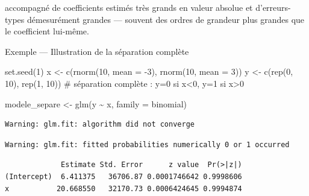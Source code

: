 \documentclass[
  french,
  letterpaper,
  DIV=11,
  numbers=noendperiod]{scrreprt}
\newenvironment{Shaded}{\begin{snugshade}}{\end{snugshade}}
\newcommand{\AttributeTok}[1]{\textcolor[rgb]{0.40,0.45,0.13}{#1}}
\newcommand{\CommentTok}[1]{\textcolor[rgb]{0.37,0.37,0.37}{#1}}
\newcommand{\DecValTok}[1]{\textcolor[rgb]{0.68,0.00,0.00}{#1}}
\newcommand{\FunctionTok}[1]{\textcolor[rgb]{0.28,0.35,0.67}{#1}}
\newcommand{\NormalTok}[1]{\textcolor[rgb]{0.00,0.23,0.31}{#1}}
\newcommand{\OtherTok}[1]{\textcolor[rgb]{0.00,0.23,0.31}{#1}}
\newcommand{\SpecialCharTok}[1]{\textcolor[rgb]{0.37,0.37,0.37}{#1}}
\begin{document}
accompagné de coefficients estimés très grands en valeur absolue et
d'erreurs-types démesurément grandes --- souvent des ordres de grandeur
plus grandes que le coefficient lui-même.

{Exemple --- Illustration de la séparation complète}

\begin{Shaded}
\begin{Highlighting}[]
\FunctionTok{set.seed}\NormalTok{(}\DecValTok{1}\NormalTok{)}
\NormalTok{x }\OtherTok{\textless{}{-}} \FunctionTok{c}\NormalTok{(}\FunctionTok{rnorm}\NormalTok{(}\DecValTok{10}\NormalTok{, }\AttributeTok{mean =} \SpecialCharTok{{-}}\DecValTok{3}\NormalTok{), }\FunctionTok{rnorm}\NormalTok{(}\DecValTok{10}\NormalTok{, }\AttributeTok{mean =} \DecValTok{3}\NormalTok{))}
\NormalTok{y }\OtherTok{\textless{}{-}} \FunctionTok{c}\NormalTok{(}\FunctionTok{rep}\NormalTok{(}\DecValTok{0}\NormalTok{, }\DecValTok{10}\NormalTok{), }\FunctionTok{rep}\NormalTok{(}\DecValTok{1}\NormalTok{, }\DecValTok{10}\NormalTok{)) }\CommentTok{\# séparation complète : y=0 si x\textless{}0, y=1 si x\textgreater{}0}

\NormalTok{modele\_separe }\OtherTok{\textless{}{-}} \FunctionTok{glm}\NormalTok{(y }\SpecialCharTok{\textasciitilde{}}\NormalTok{ x, }\AttributeTok{family =}\NormalTok{ binomial)}
\end{Highlighting}
\end{Shaded}

\begin{verbatim}
Warning: glm.fit: algorithm did not converge
\end{verbatim}

\begin{verbatim}
Warning: glm.fit: fitted probabilities numerically 0 or 1 occurred
\end{verbatim}

\begin{Shaded}
\end{Shaded}

\begin{verbatim}
             Estimate Std. Error      z value  Pr(>|z|)
(Intercept)  6.411375   36706.87 0.0001746642 0.9998606
x           20.668550   32170.73 0.0006424645 0.9994874
\end{verbatim}
\end{document}
